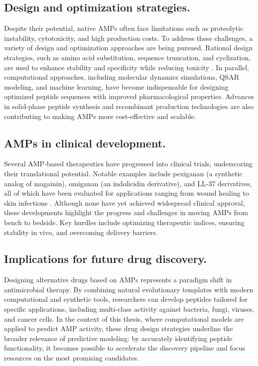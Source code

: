 \documentclass[a4paper,twoside,12pt]{book}
\begin{document}
\subsection{Design and optimization strategies.}
Despite their potential, native AMPs often face limitations such as proteolytic instability, cytotoxicity, and high production costs. To address these challenges, a variety of design and optimization approaches are being pursued. Rational design strategies, such as amino acid substitution, sequence truncation, and cyclization, are used to enhance stability and specificity while reducing toxicity \cite{bib:fjell2012}. In parallel, computational approaches, including molecular dynamics simulations, QSAR modeling, and machine learning, have become indispensable for designing optimized peptide sequences with improved pharmacological properties. Advances in solid-phase peptide synthesis and recombinant production technologies are also contributing to making AMPs more cost-effective and scalable.

\subsection{AMPs in clinical development.}
Several AMP-based therapeutics have progressed into clinical trials, underscoring their translational potential. Notable examples include pexiganan (a synthetic analog of magainin), omiganan (an indolicidin derivative), and LL-37 derivatives, all of which have been evaluated for applications ranging from wound healing to skin infections \cite{bib:mahlapuu2016}. Although none have yet achieved widespread clinical approval, these developments highlight the progress and challenges in moving AMPs from bench to bedside. Key hurdles include optimizing therapeutic indices, ensuring stability in vivo, and overcoming delivery barriers.

\subsection{Implications for future drug discovery.}
Designing alternative drugs based on AMPs represents a paradigm shift in antimicrobial therapy. By combining natural evolutionary templates with modern computational and synthetic tools, researchers can develop peptides tailored for specific applications, including multi-class activity against bacteria, fungi, viruses, and cancer cells. In the context of this thesis, where computational models are applied to predict AMP activity, these drug design strategies underline the broader relevance of predictive modeling: by accurately identifying peptide functionality, it becomes possible to accelerate the discovery pipeline and focus resources on the most promising candidates.
\end{document}
